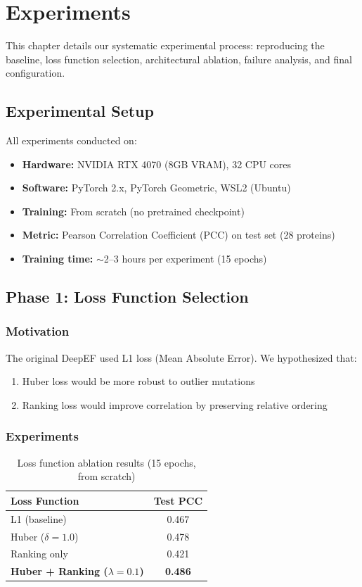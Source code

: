 \chapter{Experiments}
\label{ch:experiments}

This chapter details our systematic experimental process: reproducing the baseline, loss function selection, architectural ablation, failure analysis, and final configuration.

\section{Experimental Setup}

All experiments conducted on:
\begin{itemize}
    \item \textbf{Hardware:} NVIDIA RTX 4070 (8GB VRAM), 32 CPU cores
    \item \textbf{Software:} PyTorch 2.x, PyTorch Geometric, WSL2 (Ubuntu)
    \item \textbf{Training:} From scratch (no pretrained checkpoint)
    \item \textbf{Metric:} Pearson Correlation Coefficient (PCC) on test set (28 proteins)
    \item \textbf{Training time:} $\sim$2--3 hours per experiment (15 epochs)
\end{itemize}

\section{Phase 1: Loss Function Selection}

\subsection{Motivation}
The original DeepEF used L1 loss (Mean Absolute Error). We hypothesized that:
\begin{enumerate}
    \item Huber loss would be more robust to outlier mutations
    \item Ranking loss would improve correlation by preserving relative ordering
\end{enumerate}

\subsection{Experiments}

\begin{table}[h]
\centering
\caption{Loss function ablation results (15 epochs, from scratch)}
\label{tab:loss_ablation}
\begin{tabular}{lc}
\toprule
\textbf{Loss Function} & \textbf{Test PCC} \\
\midrule
L1 (baseline) & 0.467 \\
Huber ($\delta = 1.0$) & 0.478 \\
Ranking only & 0.421 \\
\textbf{Huber + Ranking ($\lambda = 0.1$)} & \textbf{0.486} \\
\bottomrule
\end{tabular}
\end{table}

